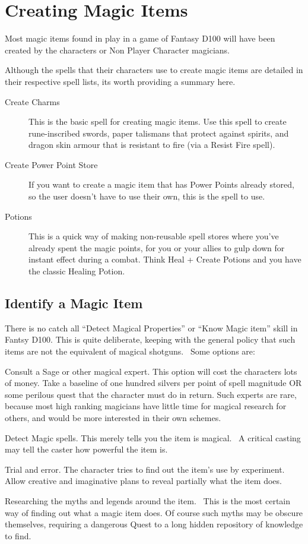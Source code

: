 \section{Creating Magic Items}

Most magic items found in play in a game of Fantasy D100 will have been created by the characters or Non Player Character magicians.

Although the spells that their characters use to create magic items are detailed in their respective spell lists, its worth providing a summary here.

\begin{description}
\item [Create Charms] This is the basic spell for creating magic items. Use this spell to create rune-inscribed swords, paper talismans that protect against spirits, and dragon skin armour that is resistant to fire (via a Resist Fire spell).
\item [Create Power Point Store] If you want to create a magic item that has Power Points already stored, so the user doesn’t have to use their own, this is the spell to use.
\item [Potions] This is a quick way of making non-reusable spell stores where you’ve already spent the magic points, for you or your allies to gulp down for instant effect during a combat. Think Heal + Create Potions and you have the classic Healing Potion.
\end{description}

\subsection{Identify a Magic Item}
There is no catch all “Detect Magical Properties” or “Know Magic item” skill in Fantsy D100. This is quite deliberate, keeping with the general policy that such items are not the equivalent of magical shotguns.  Some options are:

Consult a Sage or other magical expert. This option will cost the characters lots of money. Take a baseline of one hundred silvers per point of spell magnitude OR some perilous quest that the character must do in return. Such experts are rare, because most high ranking magicians have little time for magical research for others, and would be more interested in their own schemes. 

Detect Magic spells. This merely tells you the item is magical.  A critical casting may tell the caster how powerful the item is.

Trial and error. The character tries to find out the item’s use by experiment. Allow creative and imaginative plans to reveal partially what the item does.

Researching the myths and legends around the item.  This is the most certain way of finding out what a magic item does. Of course such myths may be obscure themselves, requiring a dangerous Quest to a long hidden repository of knowledge to find.

